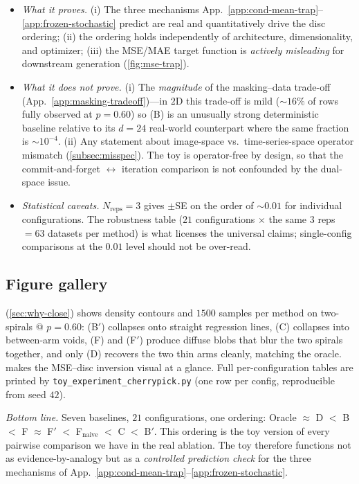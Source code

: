\documentclass{article}
\theoremstyle{plain}
\theoremstyle{definition}
\theoremstyle{remark}
\begin{document}
\begin{itemize}
\setlength{\itemsep}{0pt}
\item \emph{What it proves.} (i) The three mechanisms App.~\ref{app:cond-mean-trap}--\ref{app:frozen-stochastic} predict are real and quantitatively drive the disc ordering; (ii) the ordering holds independently of architecture, dimensionality, and optimizer; (iii) the MSE/MAE target function is \emph{actively misleading} for downstream generation (\cref{fig:mse-trap}).
\item \emph{What it does not prove.} (i) The \emph{magnitude} of the masking--data trade-off (App.~\ref{app:masking-tradeoff})---in $2$D this trade-off is mild (${\sim}16\%$ of rows fully observed at $p = 0.60$) so (B) is an unusually strong deterministic baseline relative to its $d = 24$ real-world counterpart where the same fraction is $\sim 10^{-4}$. (ii) Any statement about image-space vs.\ time-series-space operator mismatch (\cref{subsec:misspec}). The toy is operator-free by design, so that the commit-and-forget $\leftrightarrow$ iteration comparison is not confounded by the dual-space issue.
\item \emph{Statistical caveats.} $N_{\mathrm{reps}} = 3$ gives $\pm$SE on the order of ${\sim}0.01$ for individual configurations. The robustness table ($21$ configurations $\times$ the same $3$ reps $= 63$ datasets per method) is what licenses the universal claims; single-config comparisons at the $0.01$ level should not be over-read.
\end{itemize}

\subsection{Figure gallery}

 (\cref{sec:why-close}) shows density contours and $1500$ samples per method on two-spirals @ $p = 0.60$: (B$'$) collapses onto straight regression lines, (C) collapses into between-arm voids, (F) and (F$'$) produce diffuse blobs that blur the two spirals together, and only (D) recovers the two thin arms cleanly, matching the oracle.  makes the MSE--disc inversion visual at a glance. Full per-configuration tables are printed by \texttt{toy\_experiment\_cherrypick.py} (one row per config, reproducible from seed $42$).

\emph{Bottom line.} Seven baselines, $21$ configurations, one ordering: Oracle $\approx$ D $<$ B $<$ F $\approx$ F$'$ $<$ F$_{\mathrm{naive}}$ $<$ C $<$ B$'$. This ordering is the toy version of every pairwise comparison we have in the real ablation. The toy therefore functions not as evidence-by-analogy but as a \emph{controlled prediction check} for the three mechanisms of App.~\ref{app:cond-mean-trap}--\ref{app:frozen-stochastic}.
\end{document}
